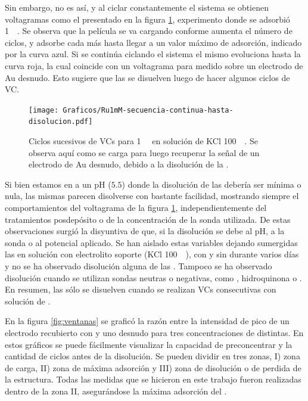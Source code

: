 		Sin embargo, no es así, y al ciclar constantemente el sistema se obtienen voltagramas como el presentado en la figura \ref{fig:diso_ru1mM}, experimento donde se adsorbió \ru\space \SI{1}{\milli\Molar}. Se observa que la película se va cargando conforme aumenta el número de ciclos, y adsorbe cada más \ru hasta llegar a un valor máximo de adsorción, indicado por la curva azul. Si se continúa ciclando el sistema el mismo evoluciona hasta la curva roja, la cual coincide con un voltagrama para \ru\space medido sobre un electrodo de Au desnudo. Esto sugiere que las \pdmF\space se disuelven luego de hacer algunos ciclos de VC.

		 	\begin{figure}[hb!]
				\centering
		 	    \texttt{[image: Graficos/Ru1mM-secuencia-continua-hasta-disolucion.pdf]}
		        \caption[Disolución de una \pdmF\space en \ru.]{Ciclos sucesivos de VCs para \ru\space \SI{1}{\milli\Molar} en solución de KCl \SI{100}{\milli\Molar}. Se observa aquí como se carga para luego recuperar la señal de un electrodo de Au desnudo, debido a la disolución de la \pdmF.}
		        \label{fig:diso_ru1mM}
		      	\end{figure} 

		Si bien estamos en a un pH ($5.5$) donde la disolución de las \pdmF\space debería ser mínima o nula, las mismas parecen disolverse con bastante facilidad, mostrando siempre el comportamientos del voltagrama de la figura \ref{fig:diso_ru1mM}, independientemente del tratamientos posdepósito o de la concentración de la sonda utilizada. De estas observaciones surgió la disyuntiva de que, si la disolución se debe al pH, a la sonda o al potencial aplicado. Se han aislado estas variables dejando sumergidas las \pdmF\space en solución con electrolito soporte (KCl \SI{100}{\milli\Molar}), con y sin \ru\space durante varios días y no se ha observado disolución alguna de las \pdm. Tampoco se ha observado disolución cuando se utilizan sondas neutras o negativas, como \fe, hidroquinona o \fc. En resumen, las \pdmF\space sólo se disuelven cuando se realizan VCs consecutivas con solución de \ru\space.
	
	     En la figura \ref{fig:ventanas} se graficó la razón entre la intensidad de pico de un electrodo recubierto con \pdmF\space y uno desnudo para tres concentraciones de \ru\space distintas. En estos gráficos se puede fácilmente visualizar la capacidad de preconcentrar y la cantidad de ciclos antes de la disolución. Se pueden dividir en tres zonas, I) zona de carga, II) zona de máxima adsorción y III) zona de disolución o de perdida de la estructura. Todas las medidas que se hicieron en este trabajo fueron realizadas dentro de la zona II, asegurándose la máxima adsorción del \ru\space.

